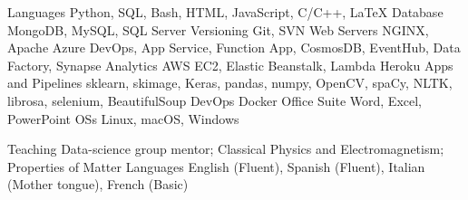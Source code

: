

\begin{cvskills}
  \cvskill
    {Languages}
    {Python, SQL, Bash, HTML, JavaScript, C/C++, LaTeX}
  \cvskill
    {Database}
    {MongoDB, MySQL, SQL Server}
  \cvskill
    {Versioning}
    {Git, SVN}
  \cvskill
    {Web Servers}
    {NGINX, Apache}
  \cvskill
    {Azure}
    {DevOps, App Service, Function App, CosmosDB, EventHub, Data Factory, Synapse Analytics}
  \cvskill
    {AWS}
    {EC2, Elastic Beanstalk, Lambda}
  \cvskill
    {Heroku}
    {Apps and Pipelines}
  {sklearn, skimage, Keras, pandas, numpy, OpenCV, spaCy, NLTK, librosa, selenium, BeautifulSoup}
  \cvskill
    {DevOps}
    {Docker}
  \cvskill
    {Office Suite}
    {Word, Excel, PowerPoint}
  \cvskill
    {OSs}
    {Linux, macOS, Windows}
\end{cvskills}



\begin{cvskills}
  \cvskill
    {Teaching}
    {Data-science group mentor; Classical Physics and Electromagnetism; Properties of Matter}
  \cvskill
    {Languages}
    {English (Fluent), Spanish (Fluent), Italian (Mother tongue), French (Basic)}
\end{cvskills}
